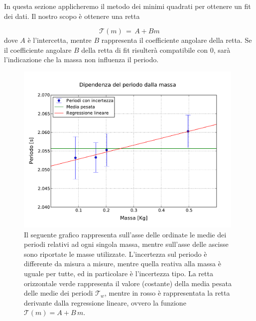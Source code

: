 In questa sezione applicheremo il metodo dei minimi quadrati per ottenere un fit dei dati.
Il nostro scopo è ottenere una retta

\begin{equation}
	\mathcal{T}(m) \,=\, A + B m 
\end{equation}
%
dove $A$ è l'intercetta, mentre $B$ rappresenta il coefficiente angolare della retta. Se il coefficiente angolare $B$ della 
retta di fit risulterà compatibile con 0, sarà l'indicazione che la massa non influenza il periodo. 

\begin{figure}
    \centering
    \includegraphics[width=110mm]{immagini/masse.pdf}
    \caption{Il seguente grafico rappresenta sull'asse delle ordinate le medie dei periodi relativi ad ogni
        singola massa, mentre sull'asse delle ascisse sono riportate le masse utilizzate. L'incertezza sul periodo
        è differente da misura a misure, mentre quella reativa alla massa è uguale per tutte, ed in particolare è
        l'incertezza tipo. La retta orizzontale verde rappresenta il valore (costante) della media pesata delle medie
        dei periodi $\mathcal{T}_w$, mentre in rosso è rappresentata la retta derivante dalla regressione lineare,
        ovvero la funzione $\mathcal{T}(m) = A + B\,m$.}
    \label{fig:masse_periodi}
\end{figure}


